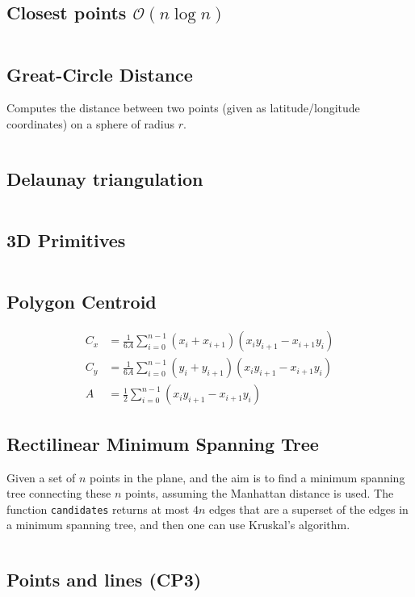 \documentclass[9pt,a4paper,landscape,oneside]{amsart}
\newcommand{\mintedstyle}[2]{\inputminted{#1}{code/#2}}
\newcommand{\code}[1]{\mintedstyle{cpp}{#1}}
\begin{document}
\begin{multicols*}{3}
\subsection{Closest points $\mathcal{O}(n \log n)$}
\code{geometry/closest_points.cpp}

\subsection{Great-Circle Distance}
Computes the distance between two points (given as latitude/longitude
coordinates) on a sphere of radius $r$.
\code{geometry/gc_distance.cpp}

\subsection{Delaunay triangulation}
\code{geometry/delaunay.cpp}

\subsection{3D Primitives}
\code{geometry/primitives3d.cpp}

\subsection{Polygon Centroid}
\begin{align*}
  C_x &= \frac{1}{6A}\sum_{i=0}^{n-1}(x_i+x_{i+1})(x_iy_{i+1} - x_{i+1}y_i) \\
  C_y &= \frac{1}{6A}\sum_{i=0}^{n-1}(y_i+y_{i+1})(x_iy_{i+1} - x_{i+1}y_i) \\
  A &= \frac12\sum_{i=0}^{n-1}(x_iy_{i+1}-x_{i+1}y_i)
\end{align*}

\subsection{Rectilinear Minimum Spanning Tree}
Given a set of $n$ points in the plane, and the aim is to find a
minimum spanning tree connecting these $n$ points, assuming the
Manhattan distance is used. The function \texttt{candidates} returns at
most $4n$ edges that are a superset of the edges in a minimum spanning
tree, and then one can use Kruskal's algorithm.
\code{geometry/rmst.cpp}

\subsection{Points and lines (CP3)}
\code{geometry/CP/points_lines.cpp}

\end{multicols*}
\end{document}
